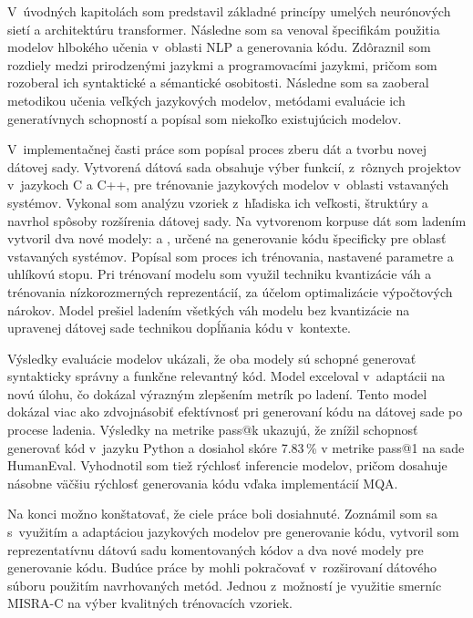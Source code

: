 V~úvodných kapitolách som predstavil základné princípy umelých neurónových sietí a architektúru transformer. Následne som sa venoval špecifikám použitia modelov hlbokého učenia v~oblasti NLP a generovania kódu. Zdôraznil som rozdiely medzi prirodzenými jazykmi a programovacími jazykmi, pričom som rozoberal ich syntaktické a sémantické osobitosti. Následne som sa zaoberal metodikou učenia veľkých jazykových modelov, metódami evaluácie ich generatívnych schopností a popísal som niekoľko existujúcich modelov.

V~implementačnej časti práce som popísal proces zberu dát a tvorbu novej dátovej sady. Vytvorená dátová sada obsahuje výber funkcií, z~rôznych projektov v~jazykoch C a C++, pre trénovanie jazykových modelov v~oblasti vstavaných systémov. Vykonal som analýzu vzoriek z~hľadiska ich veľkosti, štruktúry a navrhol spôsoby rozšírenia dátovej sady. Na vytvorenom korpuse dát som ladením vytvoril dva nové modely: \MC{} a \MCfim{}, určené na generovanie kódu špecificky pre oblasť vstavaných systémov. Popísal som proces ich trénovania, nastavené parametre a uhlíkovú stopu. Pri trénovaní modelu \MC{} som využil techniku kvantizácie váh a trénovania nízkorozmerných reprezentácií, za účelom optimalizácie výpočtových nárokov. Model \MCfim{} prešiel ladením všetkých váh modelu bez kvantizácie na upravenej dátovej sade technikou dopĺňania kódu v~kontexte.

Výsledky evaluácie modelov ukázali, že oba modely sú schopné generovať syntakticky správny a funkčne relevantný kód. Model \MCfim{} exceloval v~adaptácii na novú úlohu, čo dokázal výrazným zlepšením metrík po ladení. Tento model dokázal viac ako zdvojnásobiť efektívnosť pri generovaní kódu na dátovej sade po procese ladenia. Výsledky na metrike pass@k ukazujú, že \MCfim{} znížil schopnosť generovať kód v~jazyku Python a dosiahol skóre 7.83\,\% v metrike pass@1 na sade HumanEval. Vyhodnotil som tiež rýchlosť inferencie modelov, pričom \MCfim{} dosahuje násobne väčšiu rýchlosť generovania kódu vďaka implementácií MQA.

Na konci možno konštatovať, že ciele práce boli dosiahnuté. Zoznámil som sa s~využitím a adaptáciou jazykových modelov pre generovanie kódu, vytvoril som reprezentatívnu dátovú sadu komentovaných kódov a dva nové modely pre generovanie kódu. Budúce práce by mohli pokračovať v~rozširovaní dátového súboru použitím navrhovaných metód. Jednou z~možností je využitie smerníc MISRA-C na výber kvalitných trénovacích vzoriek.
%